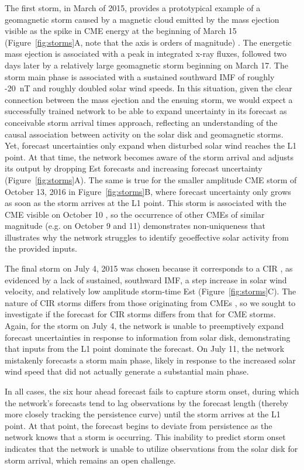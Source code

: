 \documentclass[draft,linenumbers]{agujournal2018}
\begin{document}
The first storm, in March of 2015, provides a prototypical example of a geomagnetic storm caused by a magnetic cloud emitted by the mass ejection visible as the spike in CME energy at the beginning of March 15 (Figure~\ref{fig:storms}A, note that the axis is orders of magnitude) \citep{Patel2019}. The energetic mass ejection is associated with a peak in integrated x-ray fluxes, followed two days later by a relatively large geomagnetic storm beginning on March 17. The storm main phase is associated with a sustained southward IMF of roughly -20~nT and roughly doubled solar wind speeds. In this situation, given the clear connection between the mass ejection and the ensuing storm, we would expect a successfully trained network to be able to expand uncertainty in its forecast as conceivable storm arrival times approach, reflecting an understanding of the causal association between activity on the solar disk and geomagnetic storms. Yet, forecast uncertainties only expand when disturbed solar wind reaches the L1 point. At that time, the network becomes aware of the storm arrival and adjusts its output by dropping Est forecasts and increasing forecast uncertainty (Figure~\ref{fig:storms}A). The same is true for the smaller amplitude CME storm of October 13, 2016 in Figure~\ref{fig:storms}B, where forecast uncertainty only grows as soon as the storm arrives at the L1 point. This storm is associated with the CME visible on October 10 \citep{Patel2019}, so the occurrence of other CMEs of similar magnitude (e.g. on October 9 and 11) demonstrates non-uniqueness that illustrates why the network struggles to identify geoeffective solar activity from the provided inputs.

The final storm on July 4, 2015 was chosen because it corresponds to a CIR \citep{Shen2017}, as evidenced by a lack of sustained, southward IMF, a step increase in solar wind velocity, and relatively low amplitude storm-time Est (Figure~\ref{fig:storms}C). The nature of CIR storms differs from those originating from CMEs \citep{Zhang2007}, so we sought to investigate if the forecast for CIR storms differs from that for CME storms. Again, for the storm on July 4, the network is unable to preemptively expand forecast uncertainties in response to information from solar disk, demonstrating that inputs from the L1 point dominate the forecast. On July 11, the network mistakenly forecasts a storm main phase, likely in response to the increased solar wind speed that did not actually generate a substantial main phase.

In all cases, the six hour ahead forecast fails to capture storm onset, during which the network's forecasts tend to lag observations by the forecast length (thereby more closely tracking the persistence curve) until the storm arrives at the L1 point. At that point, the forecast begins to deviate from persistence as the network knows that a storm is occurring. This inability to predict storm onset indicates that the network is unable to utilize observations from the solar disk for storm arrival, which remains an open challenge. 
\end{document}
